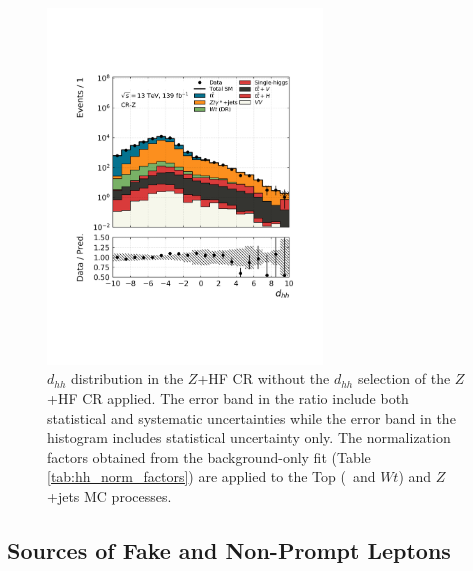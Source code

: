 \begin{figure}[!htb]
    \centering
    \includegraphics[width=0.65\textwidth]{figures/search_hh/bkg_estimate/crvr/crzhf/crztest_NN_d_hh_fullsys}
    \caption{
    $d_{hh}$ distribution in the $Z$+HF CR without the $d_{hh}$ selection of the $Z$+HF CR applied.
    The error band in the ratio include both statistical and systematic uncertainties while the
    error band in the histogram includes statistical uncertainty only.
    The normalization factors obtained from the background-only fit (Table \ref{tab:hh_norm_factors}) are applied
    to the Top (\ttbar~and $Wt$) and $Z$+jets MC processes.
    }
    \label{fig:crz_nm1_dhh}
\end{figure}

%
%

\FloatBarrier
\subsection{Sources of Fake and Non-Prompt Leptons}
\label{sec:hh_fakes}

